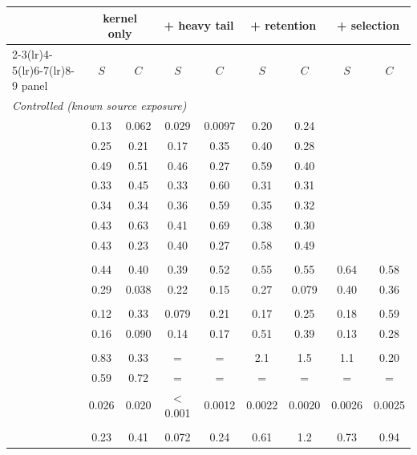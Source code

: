\begin{tabular}{lcccccccc}
\toprule
 & \multicolumn{2}{c}{kernel only} & \multicolumn{2}{c}{+ heavy tail} & \multicolumn{2}{c}{+ retention} & \multicolumn{2}{c}{+ selection} \\
\cmidrule(lr){2-3}\cmidrule(lr){4-5}\cmidrule(lr){6-7}\cmidrule(lr){8-9}
panel & $S$ & $C$ & $S$ & $C$ & $S$ & $C$ & $S$ & $C$ \\
\midrule
\multicolumn{9}{l}{\textit{Controlled (known source exposure)}} \\
\adamsLo{} & 0.13 & 0.062 & 0.029 & 0.0097 & 0.20 & 0.24 &  &  \\
\adamsMid{} & 0.25 & 0.21 & 0.17 & 0.35 & 0.40 & 0.28 &  &  \\
\adamsHi{} & 0.49 & 0.51 & 0.46 & 0.27 & 0.59 & 0.40 &  &  \\
\takacsCtl{} & 0.33 & 0.45 & 0.33 & 0.60 & 0.31 & 0.31 &  &  \\
\takacsDis{} & 0.34 & 0.34 & 0.36 & 0.59 & 0.35 & 0.32 &  &  \\
\takacsOne{} & 0.43 & 0.63 & 0.41 & 0.69 & 0.38 & 0.30 &  &  \\
\becker{} & 0.43 & 0.23 & 0.40 & 0.27 & 0.58 & 0.49 &  &  \\
\addlinespace
\multicolumn{9}{l}{\textit{Controlled (latent source exposure)}} \\
\vkg{} & 0.44 & 0.40 & 0.39 & 0.52 & 0.55 & 0.55 & 0.64 & 0.58 \\
\vkc{} & 0.29 & 0.038 & 0.22 & 0.15 & 0.27 & 0.079 & 0.40 & 0.36 \\
\addlinespace
\multicolumn{9}{l}{\textit{Political}} \\
\senate{} & 0.12 & 0.33 & 0.079 & 0.21 & 0.17 & 0.25 & 0.18 & 0.59 \\
\house{} & 0.16 & 0.090 & 0.14 & 0.17 & 0.51 & 0.39 & 0.13 & 0.28 \\
\addlinespace
\multicolumn{9}{l}{\textit{Social media}} \\
\cmv{} & 0.83 & 0.33 & = & = & 2.1 & 1.5 & 1.1 & 0.20 \\
\spinos{} & 0.59 & 0.72 & = & = & = & = & = & = \\
\kozitsin{} & 0.026 & 0.020 & $<$0.001 & 0.0012 & 0.0022 & 0.0020 & 0.0026 & 0.0025 \\
\addlinespace
\multicolumn{9}{l}{\textit{Prediction markets}} \\
\markets{} & 0.23 & 0.41 & 0.072 & 0.24 & 0.61 & 1.2 & 0.73 & 0.94 \\
\bottomrule
\end{tabular}
